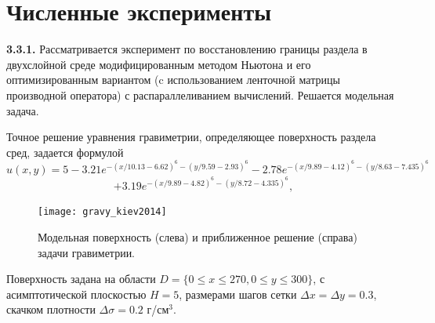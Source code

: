 \newpage
\section{Численные эксперименты}

{\bfseries 3.3.1.} Рассматривается эксперимент по восстановлению границы раздела в двухслойной среде модифицированным методом Ньютона и его оптимизированным вариантом (c использованием ленточной матрицы производной оператора) с распараллеливанием вычислений. Решается модельная задача.

Точное решение уравнения гравиметрии, определяющее поверхность раздела сред, задается формулой
$$\hat{u}(x,y)=5-3.21e^{-(x/10.13-6.62)^6-(y/9.59-2.93)^6}-2.78e^{-(x/9.89-4.12)^6-(y/8.63-7.435)^6}$$ 
\begin{equation}\label{exact_exp3.4.1}
+3.19e^{-(x/9.89-4.82)^6-(y/8.72-4.335)^6},
\end{equation}
\begin{figure}
	\centering
	\texttt{[image: gravy\_kiev2014]}
	\caption{Модельная поверхность (слева) и приближенное решение (справа) задачи гравиметрии.}
	\label{fig:gravy_kiev2014}
\end{figure}
Поверхность задана на области $D=\{0\le x\le 270, 0\le y\le 300\}$, с асимптотической плоскостью $H=5$, размерами шагов сетки $\Delta x=\Delta y=0.3$, скачком плотности $\Delta\sigma=0.2$ г/см$^3$.

